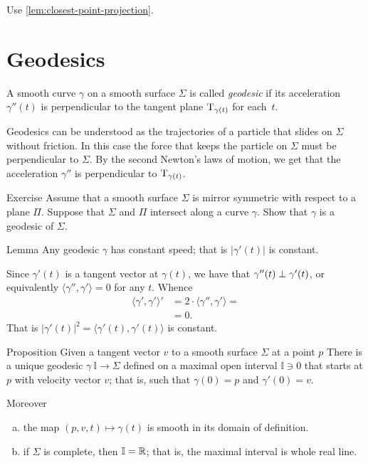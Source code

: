  Use \ref{lem:closest-point-projection}.


\section*{Geodesics}

A smooth curve $\gamma$ on a smooth surface $\Sigma$ is called \emph{geodesic} if its acceleration $\gamma''(t)$ is perpendicular to the tangent plane $\mathrm{T}_{\gamma(t)}$ for each~$t$.

Geodesics can be understood as the trajectories of a particle that slides on $\Sigma$ without friction.
In this case the force that keeps the particle on $\Sigma$ must be perpendicular to $\Sigma$.
By the second Newton's laws of motion,
we get that the acceleration $\gamma''$ is perpendicular to $\mathrm{T}_{\gamma(t)}$.

\begin{thm}{Exercise}\label{ex:reflection-geodesic}
Assume that a smooth surface $\Sigma$ is mirror symmetric with respect to  a plane $\Pi$.
Suppose that $\Sigma$ and $\Pi$ intersect along a curve $\gamma$.
Show that $\gamma$ is a geodesic of $\Sigma$.
\end{thm}

\begin{thm}{Lemma}\label{lem:constant-speed}
Any geodesic $\gamma$ has constant speed; that is $|\gamma'(t)|$ is constant.
\end{thm}

Since $\gamma'(t)$ is a tangent vector at $\gamma(t)$,
we have that $\gamma''(t)\z\perp\gamma'(t)$, or equivalently $\langle\gamma'',\gamma'\rangle=0$ for any $t$.
Whence 
\begin{align*}
\langle\gamma',\gamma'\rangle'&=2\cdot \langle\gamma'',\gamma'\rangle=
\\
&=0.
\end{align*}
That is $|\gamma'(t)|^2=\langle\gamma'(t),\gamma'(t)\rangle$ is constant.
\qeds

\begin{thm}{Proposition}\label{prop:geod-existance} 
Given a tangent vector $v$ to a smooth surface $\Sigma$ at a point $p$
There is a unique geodesic $\gamma\:\mathbb{I}\to \Sigma$ defined on a maximal open interval $\mathbb{I}\ni 0$ that starts at $p$ with velocity vector $v$;
that is, such that $\gamma(0)=p$ and $\gamma'(0)=v$.

Moreover
\begin{enumerate}[(a)]
\item\label{prop:geod-existance:smooth} the map $(p,v,t)\mapsto \gamma(t)$ is smooth in its domain of definition.
\item\label{prop:geod-existance:whole} if $\Sigma$ is complete, then $\mathbb{I}=\mathbb{R}$; that is, the maximal interval is whole real line.
\end{enumerate}

\end{thm}

